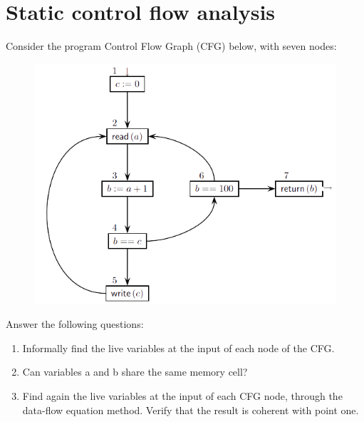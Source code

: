 \documentclass[12pt, a4paper]{report}
\begin{document}
    \section{Static control flow analysis}
        Consider the program Control Flow Graph (CFG) below, with seven nodes:
        \begin{figure}[H]
            \centering
            \includegraphics[width=0.75\linewidth]{images/CFG.png}
        \end{figure} 
        Answer the following questions:
        \begin{enumerate}
            \item Informally find the live variables at the input of each node of the CFG.
            \item Can variables a and b share the same memory cell?
            \item Find again the live variables at the input of each CFG node, through the data-flow equation method. Verify that the result is coherent with point one. 
        \end{enumerate}
\end{document}
